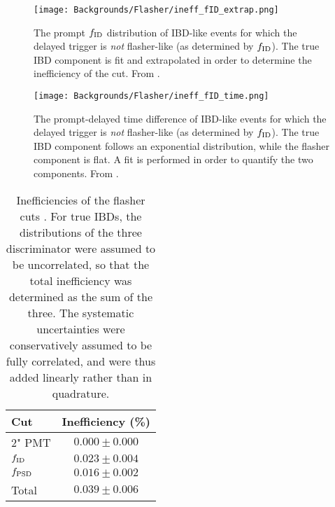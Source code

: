 \documentclass[../thesis.tex]{subfiles}
\begin{document}
\begin{figure}[ht]
  \texttt{[image: Backgrounds/Flasher/ineff\_fID\_extrap.png]}
  \caption{The prompt $f_{\mathrm{ID}}$ distribution of IBD-like events for which the delayed trigger is \emph{not} flasher-like (as determined by $f_{\mathrm{ID}}$). The true IBD component is fit and extrapolated in order to determine the inefficiency of the cut. From \cite{patrickFlashers}.}
  \label{fig:flasher_fID_extrap}
\end{figure}

\begin{figure}[ht]
  \texttt{[image: Backgrounds/Flasher/ineff\_fID\_time.png]}
  \caption{The prompt-delayed time difference of IBD-like events for which the delayed trigger is \emph{not} flasher-like (as determined by $f_{\mathrm{ID}}$). The true IBD component follows an exponential distribution, while the flasher component is flat. A fit is performed in order to quantify the two components. From \cite{patrickFlashers}.}
  \label{fig:flasher_fID_time}
\end{figure}

\begin{table}[ht]
  \begin{tabular}{lc}
    \toprule
    Cut & Inefficiency (\%) \\
    \midrule
    2" PMT  & $0.000 \pm 0.000$ \\
    $f_{\mathrm{ID}}$  & $0.023 \pm 0.004$ \\
    $f_{\mathrm{PSD}}$ & $0.016 \pm 0.002$ \\
    \midrule
    Total & $0.039 \pm 0.006$ \\
    \bottomrule
  \end{tabular}
  \caption{Inefficiencies of the flasher cuts \cite{patrickFlashers}. For true IBDs, the distributions of the three discriminator were assumed to be uncorrelated, so that the total inefficiency was determined as the sum of the three. The systematic uncertainties were conservatively assumed to be fully correlated, and were thus added linearly rather than in quadrature.}
  \label{tab:flasher_ineff}
\end{table}


\end{document}

